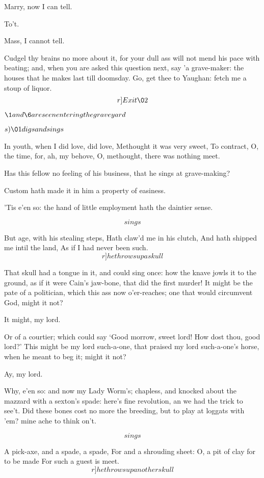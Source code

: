 \documentclass[11pt]{book}
\newenvironment {song}[1][0]
 {\Versus 
  \Locus \textus {+7em+#1em} 
  \Forma \strophae {01}
 }
 {\endVersus}
\begin{document}
	Marry, now I can tell.

	To't.

	Mass, I cannot tell.


	Cudgel thy brains no more about it, for your dull
	ass will not mend his pace with beating; and, when
	you are asked this question next, say 'a
	grave-maker: the houses that he makes last till
	doomsday. Go, get thee to Yaughan: fetch me a
	stoup of liquor. 	\[r]Exit \02\]

	\(\1 and \6 are seen entering the graveyard\)

	\(s)\01 digs and sings\)
\begin{song}[-4]
 In youth, when I did love, did love,
	Methought it was very sweet,
	To contract, O, the time, for, ah, my behove,
	O, methought, there was nothing meet.
\end{song}

\1	Has this fellow no feeling of his business, that he
	sings at grave-making?

\6	Custom hath made it in him a property of easiness.

\1	'Tis e'en so: the hand of little employment hath
	the daintier sense.

 \[sings\]
\begin{song}[-4]
	But age, with his stealing steps,
	Hath claw'd me in his clutch,
	And hath shipped me intil the land,
	As if I had never been such.
\end{song}
	\[r]he throws up a skull\]

\1	That skull had a tongue in it, and could sing once:
	how the knave jowls it to the ground, as if it were
	Cain's jaw-bone, that did the first murder! It
	might be the pate of a politician, which this ass
	now o'er-reaches; one that would circumvent God,
	might it not?

\6	It might, my lord.

\1	Or of a courtier; which could say `Good morrow,
	sweet lord! How dost thou, good lord?' This might
	be my lord such-a-one, that praised my lord
	such-a-one's horse, when he meant to beg it; might it not?

\6	Ay, my lord.

\1	Why, e'en so: and now my Lady Worm's; chapless, and
	knocked about the mazzard with a sexton's spade:
	here's fine revolution, an we had the trick to
	see't. Did these bones cost no more the breeding,
	but to play at loggats with 'em? mine ache to think on't.

 \[sings\]
\begin{song}[-4]
	A pick-axe, and a spade, a spade,
	For and a shrouding sheet:
	O, a pit of clay for to be made
	For such a guest is meet.
\end{song}
	\[r]he throws up another skull\]
\end{document}
